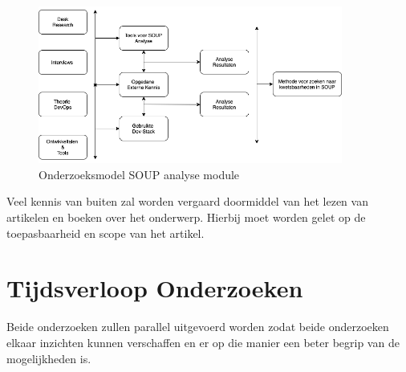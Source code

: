 \begin{figure}[h!] %
  \myfloatalign
  \includegraphics[width=10cm]{gfx/OnderzoeksmodelSOUP}
  \caption{Onderzoeksmodel SOUP analyse module}
  \label{fig:Onderzoeks model Dev-Stack}
\end{figure}

Veel kennis van buiten zal worden vergaard doormiddel van het lezen van artikelen en boeken over het onderwerp.
Hierbij moet worden gelet op de toepasbaarheid en scope van het artikel.

\section{Tijdsverloop Onderzoeken}\label{sec:tijdsverloop-onderzoeken}
Beide onderzoeken zullen parallel uitgevoerd worden zodat beide onderzoeken elkaar inzichten kunnen verschaffen en er op die manier een beter begrip van de mogelijkheden is.
